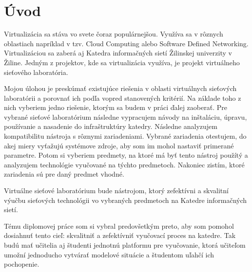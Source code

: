 \chapter*{Úvod}

Virtualizácia sa stáva vo svete čoraz populárnejšou. Využíva sa v rôznych oblastiach napríklad v tzv. Cloud Computing alebo Software Defined Networking. Virtualizáciou sa zaberá aj Katedra informačných sietí Žilinskej univerzity v Žiline. Jedným z projektov, kde sa virtualizácia využíva, je projekt virtuálneho sieťového laboratória. 

Mojou úlohou je preskúmať existujúce riešenia v oblasti virtuálnych sieťových laboratórii a porovnať ich podľa vopred stanovených kritérií. Na základe toho z nich vyberiem jedno riešenie, ktorým sa budem v práci ďalej zaoberať. Pre vybrané sieťové laboratórium následne vypracujem návody na inštaláciu, úpravu, používanie a nasadenie do infraštruktúry katedry. Následne analyzujem kompatibilitu nástroja s rôznymi zariadeniami. Vybrané zariadenia otestujem, do akej miery vyťažujú systémove zdroje, aby som im mohol nastaviť primerané parametre. Potom si vyberiem predmety, na ktoré má byť tento nástroj použítý a analyzujem technológie vyučované na týchto predmetoch. Nakoniec zistím, ktoré zariadenia sú pre daný predmet vhodné.

Virtuálne sieťové laboratórium bude nástrojom, ktorý zefektívni a skvalitní výučbu sieťových technológii vo vybraných predmetoch na Katedre informačných sietí.

Tému diplomovej práce som si vybral predovšetkým preto, aby som pomohol dosiahnuť tento cieľ: skvalitniť a zefektívniť vyučovací proces na katedre. Tak budú mať učitelia aj študenti jednotnú platformu pre vyučovanie, ktorá učiteľom umožní jednoducho vytvárať modelové situácie a študentom uľahčí ich pochopenie.